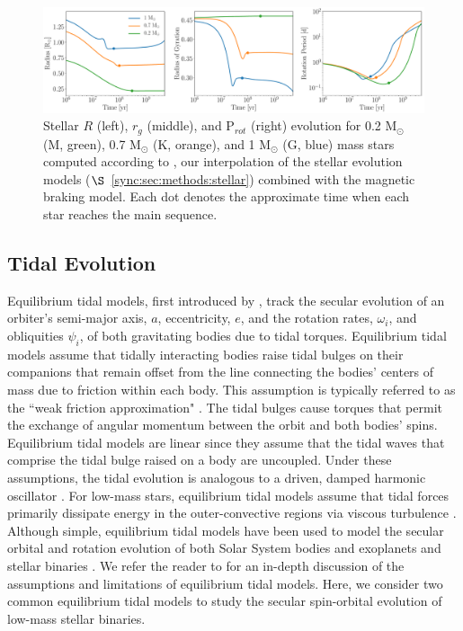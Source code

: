 
\begin{figure}
	\includegraphics[width=\columnwidth]{stellarExample.pdf}
   \caption{Stellar $R$ (left), $r_g$ (middle), and P$_{rot}$ (right) evolution for 0.2 M$_{\odot}$ (M, green), 0.7 M$_{\odot}$ (K, orange), and 1 M$_{\odot}$ (G, blue) mass stars computed according to \stellar, our interpolation of the \citet{Baraffe2015} stellar evolution models ($\S$~\ref{sync:sec:methods:stellar}) combined with the \citet{Matt2015} magnetic braking model. Each dot denotes the approximate time when each star reaches the main sequence.}%
    \label{sync:fig:stellarExample}%
\end{figure}

\subsection{Tidal Evolution} \label{sync:sec:methods:eqtide}

 Equilibrium tidal models, first introduced by \citet{Darwin1880}, track the secular evolution of an orbiter's semi-major axis, $a$, eccentricity, $e$, and the rotation rates, $\omega_i$, and obliquities $\psi_i$, of both gravitating bodies due to tidal torques. Equilibrium tidal models assume that tidally interacting bodies raise tidal bulges on their companions that remain offset from the line connecting the bodies' centers of mass due to friction within each body. This assumption is typically referred to as the ``weak friction approximation" \citep{Zahn2008}.  The tidal bulges cause torques that permit the exchange of angular momentum between the orbit and both bodies' spins. Equilibrium tidal models are linear since they assume that the tidal waves that comprise the tidal bulge raised on a body are uncoupled. Under these assumptions, the tidal evolution is analogous to a driven, damped harmonic oscillator \citep{Greenberg2009}. For low-mass stars, equilibrium tidal models assume that tidal forces primarily dissipate energy in the outer-convective regions via viscous turbulence \citep[see][]{Zahn2008}. Although simple, equilibrium tidal models have been used to model the secular orbital and rotation evolution of both Solar System bodies and exoplanets \citep[e.g.][]{Goldreich1966,Jackson2009,Leconte2010,Heller2011,Barnes2013,Barnes2017} and stellar binaries \citep[e.g.][]{Zahn1989,Zahn2008,Khaliullin2011,Repetto2014,Fleming2018}. We refer the reader to \citet{Barnes2017} for an in-depth discussion of the assumptions and limitations of equilibrium tidal models. Here, we consider two common equilibrium tidal models to study the secular spin-orbital evolution of low-mass stellar binaries.  

